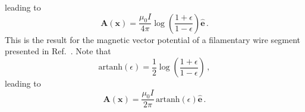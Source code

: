 leading to
\begin{equation}
 \mathbf{A}(\mathbf{x}) = \frac{\mu_0 I}{4 \pi} \log\left(\frac{1 + \epsilon}{1 - \epsilon} \right) \hat{\mathbf{e}} \, . \label{eqn:A_log_eps}
\end{equation}
This is the result for the magnetic vector potential of a filamentary wire segment presented in Ref.~\cite{hanson_hirshman_2002}.
Note that
\begin{equation}
 \mathrm{artanh}\left( \epsilon \right) = \frac{1}{2} \log\left(\frac{1 + \epsilon}{1 - \epsilon} \right) \, ,
\end{equation}
leading to
\begin{equation}
 \boxed{\mathbf{A}(\mathbf{x}) = \frac{\mu_0 I}{2 \pi} \, \mathrm{artanh} \left( \epsilon \right) \hat{\mathbf{e}}} \, . \label{eqn:A_artanh}
\end{equation}

